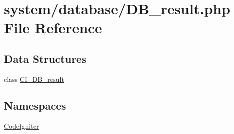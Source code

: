 \hypertarget{_d_b__result_8php}{}\section{system/database/\+D\+B\+\_\+result.php File Reference}
\label{_d_b__result_8php}
\subsection*{Data Structures}
\begin{DoxyCompactItemize}
\item 
class \mbox{\hyperlink{class_c_i___d_b__result}{C\+I\+\_\+\+D\+B\+\_\+result}}
\end{DoxyCompactItemize}
\subsection*{Namespaces}
\begin{DoxyCompactItemize}
\item 
 \mbox{\hyperlink{namespace_code_igniter}{Code\+Igniter}}
\end{DoxyCompactItemize}
